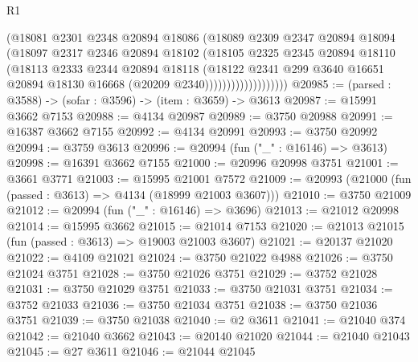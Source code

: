 \begin{lexlean}{R1}
\begin{coremodule}
                            (@18081
                              @2301
                              @2348
                              @20894
                              @18086
                              (@18089
                                @2309
                                @2347
                                @20894
                                @18094
                                (@18097
                                  @2317
                                  @2346
                                  @20894
                                  @18102
                                  (@18105
                                    @2325
                                    @2345
                                    @20894
                                    @18110
                                    (@18113
                                      @2333
                                      @2344
                                      @20894
                                      @18118
                                      (@18122
                                        @2341
                                        @299
                                        @3640
                                        @16651
                                        @20894
                                        @18130
                                        @16668
                                        (@20209 @2340)))))))))))))))))))
@20985 := (parsed : @3588) -> (sofar : @3596) -> (item : @3659) -> @3613
@20987 := @15991 @3662 @7153
@20988 := @4134 @20987
@20989 := @3750 @20988
@20991 := @16387 @3662 @7155
@20992 := @4134 @20991
@20993 := @3750 @20992
@20994 := @3759 @3613
@20996 := @20994 (fun ("_" : @16146) => @3613)
@20998 := @16391 @3662 @7155
@21000 := @20996 @20998 @3751
@21001 := @3661 @3771
@21003 := @15995 @21001 @7572
@21009 := @20993 (@21000 (fun (passed : @3613) => @4134 (@18999 @21003 @3607)))
@21010 := @3750 @21009
@21012 := @20994 (fun ("_" : @16146) => @3696)
@21013 := @21012 @20998
@21014 := @15995 @3662
@21015 := @21014 @7153
@21020 := @21013 @21015 (fun (passed : @3613) => @19003 @21003 @3607)
@21021 := @20137 @21020
@21022 := @4109 @21021
@21024 := @3750 @21022 @4988
@21026 := @3750 @21024 @3751
@21028 := @3750 @21026 @3751
@21029 := @3752 @21028
@21031 := @3750 @21029 @3751
@21033 := @3750 @21031 @3751
@21034 := @3752 @21033
@21036 := @3750 @21034 @3751
@21038 := @3750 @21036 @3751
@21039 := @3750 @21038
@21040 := @2 @3611
@21041 := @21040 @374
@21042 := @21040 @3662
@21043 := @20140 @21020
@21044 := @21040 @21043
@21045 := @27 @3611
@21046 := @21044 @21045

\end{coremodule}
\end{lexlean}
